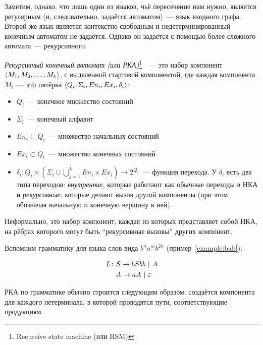 Заметим, однако, что лишь один из языков, чьё пересечение нам нужно, является регулярным (и, следовательно, задаётся автоматом)~--- язык входного графа. Второй же язык является контекстно-свободным и недетерминированный конечным автоматом не задаётся. Однако он задаётся с помощью более сложного автомата~--- рекурсивного. 

\begin{definition}
  \textit{Рекурсивный конечный автомат (или РКА)}\footnote{Recursive state machine (или RSM)}~\cite{Alur05}~--- это набор компонент $\langle M_1, M_2, \dots, M_k \rangle$, с выделенной стартовой компонентой, где каждая компонента $M_i$~--- это пятёрка $\langle Q_i, \Sigma_i, En_i, Ex_i, \delta_i \rangle$:
      \vspace{-\topsep}
      \begin{itemize}
        \setlength\itemsep{-0.1em}
        \item $Q_i$~--- конечное множество состояний
        \item $\Sigma_i$~--- конечный алфавит
        \item $En_i \subset Q_i$~--- множество начальных состояний
        \item $Ex_i \subset Q_i$~--- множество конечных состояний
        \item $\delta_i \colon Q_i \times (\Sigma_i \cup \bigcup\limits_{j = 1}^k En_i \times Ex_i ) \to 2^{Q_i}$~--- функция перехода. У $\delta_i$ есть два типа переходов: \textit{внутренние}, которые работают как обычные переходы в НКА и \textit{рекурсивные}, которые делают вызов другой компоненты (при этом обозначая начальную и конечную вершину в ней).
      \end{itemize}

  Неформально, это набор компонент, каждая из которых представляет собой НКА, на рёбрах которого могут быть ``рекурсивные вызовы'' других компонент.

\end{definition}

\begin{example}
  Вспомним грамматику для языка слов вида $b^n a^m b^{2n}$ (пример~\ref{example:bab}):

  \begin{align*}
    L \colon &S \rightarrow b S bb ~|~ A \\
    &A \rightarrow aA ~|~ \varepsilon
  \end{align*}

  РКА по грамматике обычно строится следующим образом: создаётся компонента для каждого нетерминала, в которой проводятся пути, соответствующие продукциям.

\end{example}

